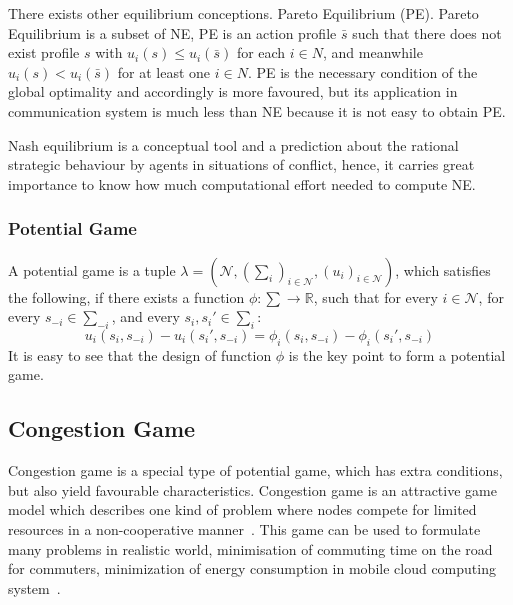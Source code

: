 There exists other equilibrium conceptions. \ie Pareto Equilibrium (PE). 
Pareto Equilibrium is a subset of NE, PE is an action profile $\bar{s}$ such that there does not exist profile $s$ with $u_i(s)\leq u_i(\bar{s})$ for each $i\in N$, and meanwhile $u_i(s)< u_i(\bar{s})$ for at least one $i\in N$.
PE is the necessary condition of the global optimality and accordingly is more favoured, but its application in communication system is much less than NE because it is not easy to obtain PE.

Nash equilibrium is a conceptual tool and a prediction about the rational strategic behaviour by agents in situations of conflict, hence, it carries great importance to know how much computational effort needed to compute NE.




\subsubsection*{Potential Game}

A potential game is a tuple $\lambda=(\mathcal{N},(\sum_i)_{i \in \mathcal{N}},(u_i)_{i\in \mathcal{N}})$, which satisfies the following, if there exists a function $\phi: \sum\rightarrow \mathbb{R}$, such that for every $i\in \mathcal{N}$, for every $s_{-i}\in \sum_{-i}$, and every $s_i, s_i'\in \sum_i$:
 \[ u_i(s_i, s_{-i})-u_i(s_i', s_{-i}) = \phi_i(s_i, s_{-i})-\phi_i(s_i', s_{-i})\]
It is easy to see that the design of function $\phi$ is the key point to form a potential game.



\subsection{Congestion Game}
Congestion game is a special type of potential game, which has extra conditions, but also yield favourable characteristics.
Congestion game is an attractive game model which describes one kind of problem where nodes compete for limited resources in a non-cooperative manner~\cite{Voecking06congestiongames}.
This game can be used to formulate many problems in realistic world, \eg minimisation of commuting time on the road for commuters, minimization of energy consumption in mobile cloud computing system~\cite{game_cloudcomputing_energy12}.

